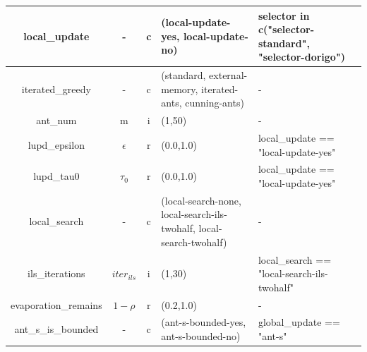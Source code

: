 \documentclass[11pt,a4paper,oneside]{book}
\begin{document}
\begin{table}[]
\begin{tabular}{|c|c|c|p{4cm}|p{4cm}|}
local\_update                   & -          & c    & (local-update-yes, local-update-no)                                             & selector in c("selector-standard", "selector-dorigo")                                          \\ \hline
iterated\_greedy                & -          & c    & (standard, external-memory, iterated-ants, cunning-ants)                          & -                                                                                             \\ \hline
ant\_num                        & m          & i    & (1,50)                                                                         & -                                                                                             \\ \hline
lupd\_epsilon                   & $\epsilon$ & r    & (0.0,1.0)                                                                      & local\_update == "local-update-yes"                                                           \\ \hline
lupd\_tau0                      & $\tau_0$   & r    & (0.0,1.0)                                                                      & local\_update == "local-update-yes"                                                           \\ \hline
local\_search                   & -          & c    & (local-search-none, local-search-ils-twohalf, local-search-twohalf)              & -                                                                                             \\ \hline
ils\_iterations                 & $iter_{ils}$ & i    & (1,30)                                                                         & local\_search == "local-search-ils-twohalf"                                                   \\ \hline
evaporation\_remains            & $1-\rho$   & r    & (0.2,1.0)                                                                      & -                                                                                             \\ \hline
ant\_s\_is\_bounded             & -          & c    & (ant-s-bounded-yes, ant-s-bounded-no)                                           & global\_update == "ant-s"                                                                     \\ \hline
\end{tabular}
\end{table}
\end{document}
